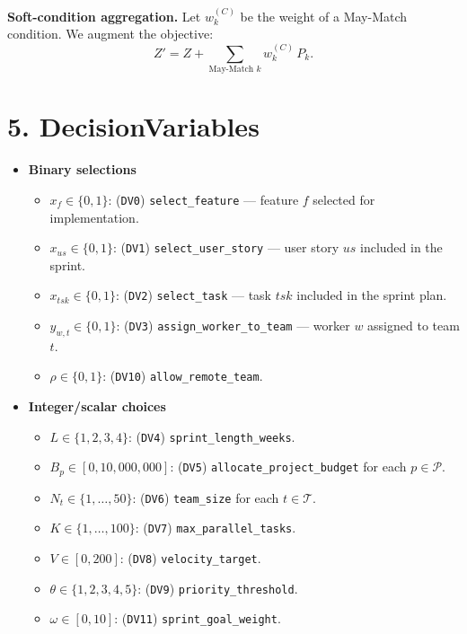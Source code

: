 \documentclass[11pt,a4paper]{article}
\begin{document}
\noindent\textbf{Soft-condition aggregation.}
Let $w^{(C)}_k$ be the weight of a May-Match condition. We augment the objective:
\[
Z' = Z + \sum_{\text{May-Match }k} w^{(C)}_k\, P_k.
\]

\section{5. DecisionVariables}
\begin{itemize}[leftmargin=*]
  \item \textbf{Binary selections}
  \begin{itemize}
    \item $x_f \in \{0,1\}$: (\texttt{DV0}) \texttt{select\_feature} --- feature $f$ selected for implementation.
    \item $x_{us} \in \{0,1\}$: (\texttt{DV1}) \texttt{select\_user\_story} --- user story $us$ included in the sprint.
    \item $x_{tsk} \in \{0,1\}$: (\texttt{DV2}) \texttt{select\_task} --- task $tsk$ included in the sprint plan.
    \item $y_{w,t} \in \{0,1\}$: (\texttt{DV3}) \texttt{assign\_worker\_to\_team} --- worker $w$ assigned to team $t$.
    \item $\rho \in \{0,1\}$: (\texttt{DV10}) \texttt{allow\_remote\_team}.
  \end{itemize}

  \item \textbf{Integer/scalar choices}
  \begin{itemize}
    \item $L \in \{1,2,3,4\}$: (\texttt{DV4}) \texttt{sprint\_length\_weeks}.
    \item $B_p \in [0,10{,}000{,}000]$: (\texttt{DV5}) \texttt{allocate\_project\_budget} for each $p\in\mathcal{P}$.
    \item $N_t \in \{1,\dots,50\}$: (\texttt{DV6}) \texttt{team\_size} for each $t\in\mathcal{T}$.
    \item $K \in \{1,\dots,100\}$: (\texttt{DV7}) \texttt{max\_parallel\_tasks}.
    \item $V \in [0,200]$: (\texttt{DV8}) \texttt{velocity\_target}.
    \item $\theta \in \{1,2,3,4,5\}$: (\texttt{DV9}) \texttt{priority\_threshold}.
    \item $\omega \in [0,10]$: (\texttt{DV11}) \texttt{sprint\_goal\_weight}.
  \end{itemize}
\end{itemize}
\end{document}
